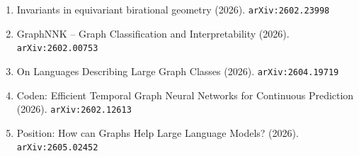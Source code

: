 \documentclass[11pt]{article}
\begin{document}
\begin{enumerate}
  \item Invariants in equivariant birational geometry (2026). \texttt{arXiv:2602.23998}
  \item GraphNNK -- Graph Classification and Interpretability (2026). \texttt{arXiv:2602.00753}
  \item On Languages Describing Large Graph Classes (2026). \texttt{arXiv:2604.19719}
  \item Coden: Efficient Temporal Graph Neural Networks for Continuous Prediction (2026). \texttt{arXiv:2602.12613}
  \item Position: How can Graphs Help Large Language Models? (2026). \texttt{arXiv:2605.02452}
\end{enumerate}
\end{document}
